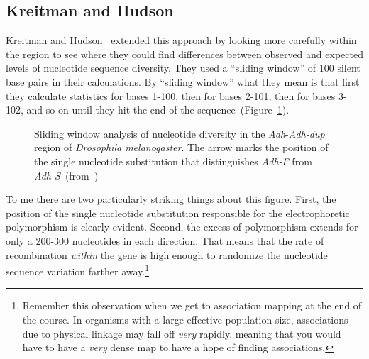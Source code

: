 \subsection*{Kreitman and Hudson}

Kreitman and Hudson~\cite{Kreitman-Hudson91} extended this approach by
looking more carefully within the region to see where they could find
differences between observed and expected levels of nucleotide
sequence diversity. They used a ``sliding window'' of 100 silent base
pairs in their calculations. By ``sliding window'' what they mean is
that first they calculate statistics for bases 1-100, then for bases
2-101, then for bases 3-102, and so on until they hit the end of the
sequence~(Figure~\ref{fig:kh}).

\begin{figure}
\begin{center}
\end{center}
\caption{Sliding window analysis of nucleotide diversity in the {\it
    Adh\/}-{\it Adh-dup} region of {\it Drosophila melanogaster}. The
  arrow marks the position of the single nucleotide substitution that
  distinguishes {\it Adh-F\/} from {\it
    Adh-S\/}~(from~\cite{Kreitman-Hudson91})}\label{fig:kh}
\end{figure}

To me there are two particularly striking things about this
figure. First, the position of the single nucleotide substitution
responsible for the electrophoretic polymorphism is clearly
evident. Second, the excess of polymorphism extends for only a 200-300
nucleotides in each direction. That means that the rate of
recombination {\it within\/} the gene is high enough to randomize the
nucleotide sequence variation farther away.\footnote{Remember this
  observation when we get to association mapping at the end of the
  course. In organisms with a large effective population size,
  associations due to physical linkage may fall off {\it very\/}
  rapidly, meaning that you would have to have a {\it very\/} dense
  map to have a hope of finding associations.}

